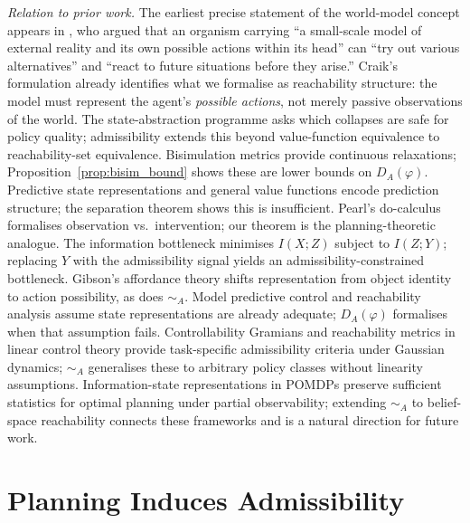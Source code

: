 \documentclass[10pt,twocolumn]{article}
\theoremstyle{plain}
\theoremstyle{definition}
\theoremstyle{remark}
\newcommand{\simA}{\sim_{\!A}}
\newcommand{\DA}{D_{A}(\varphi)}
\begin{document}
\textit{Relation to prior work.} The earliest precise statement of the world-model
concept appears in \citet{craik1943nature}, who argued that an organism carrying
``a small-scale model of external reality and its own possible actions within its
head'' can ``try out various alternatives'' and ``react to future situations before
they arise.'' Craik's formulation already identifies what we formalise as
reachability structure: the model must represent the agent's \emph{possible
actions}, not merely passive observations of the world. The state-abstraction programme
\citep{li2006towards,ravindran2004algebraic} asks which collapses are safe for
policy quality; admissibility extends this beyond value-function equivalence to
reachability-set equivalence. Bisimulation metrics \citep{ferns2004metrics,
castro2010bisimulation,kemertas2021towards,zhang2021learning} provide continuous
relaxations; Proposition~\ref{prop:bisim_bound} shows these are lower bounds on
$\DA$. Predictive state representations \citep{littman2002predictive} and general
value functions \citep{sutton2011horde} encode prediction structure; the
separation theorem shows this is insufficient. Pearl's do-calculus
\citep{pearl2009causality} formalises observation vs.\ intervention; our theorem
is the planning-theoretic analogue. The information bottleneck
\citep{tishby1999information} minimises $I(X;Z)$ subject to $I(Z;Y)$; replacing
$Y$ with the admissibility signal yields an admissibility-constrained bottleneck.
Gibson's affordance theory \citep{gibson1979ecological} shifts representation
from object identity to action possibility, as does $\simA$. Model predictive
control \citep{mayne2000model,garcia1989model} and reachability analysis
\citep{tomlin2003computational} assume state representations are already adequate;
$\DA$ formalises when that assumption fails. Controllability Gramians and
reachability metrics in linear control theory \citep{kalman1960general} provide
task-specific admissibility criteria under Gaussian dynamics; $\simA$ generalises
these to arbitrary policy classes without linearity assumptions.
Information-state representations in POMDPs \citep{kaelbling1998planning} preserve
sufficient statistics for optimal planning under partial observability; extending
$\simA$ to belief-space reachability connects these frameworks and is a natural
direction for future work.

\section{Planning Induces Admissibility}
\label{sec:planning}
\end{document}
